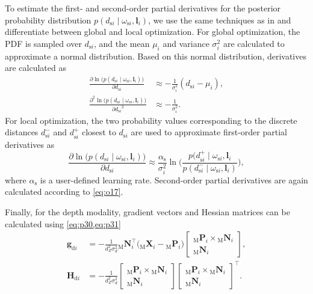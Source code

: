 \documentclass[10pt,twocolumn,letterpaper]{article}
\begin{document}
To estimate the first- and second-order partial derivatives for the posterior probability distribution $p(d_{\textrm{s}i}\mid\omega_{\textrm{s}i},\pmb{l}_i)$, we use the same techniques as in \cite{Stoiber2021} and differentiate between global and local optimization.
For global optimization, the \ac{PDF} is sampled over $d_{\textrm{s}i}$, and the mean $\mu_i$ and variance $\sigma_i^2$ are calculated to approximate a normal distribution.
Based on this normal distribution, derivatives are calculated as
\begin{align}\label{eq:o16}
	\frac{\partial\ln\big(p(d_{\textrm{s}i}\mid\omega_{\textrm{s}i},\pmb{l}_i)\big)}{\partial {d_{\textrm{s}i}}} &\approx -\frac{1}{\sigma_i^2}(d_{\textrm{s}i} - \mu_i),\\ \label{eq:o17}
	\frac{\partial^2\ln\big(p(d_{\textrm{s}i}\mid\omega_{\textrm{s}i},\pmb{l}_i)\big)}{\partial {d_{\textrm{s}i}}^2} &\approx -\frac{1}{\sigma_i^2}.
\end{align}
For local optimization, the two probability values corresponding to the discrete distances $d_{\textrm{s}i}^-$ and $d_{\textrm{s}i}^+$ closest to $d_{\textrm{s}i}$ are used to approximate first-order partial derivatives as
\begin{equation}\label{eq:o18}
	\frac{\partial\ln\big(p(d_{\textrm{s}i}\mid\omega_{\textrm{s}i},\pmb{l}_i)\big)}{\partial {d_{\textrm{s}i}}} \approx \frac{\alpha_\textrm{s}}{\sigma_i^2}\ln\bigg(\frac{p(d_{\textrm{s}i}^+\mid\omega_{\textrm{s}i},\pmb{l}_i}{p(d_{\textrm{s}i}^-\mid\omega_{\textrm{s}i},\pmb{l}_i)}\bigg),
\end{equation}
where $\alpha_\textrm{s}$ is a user-defined learning rate.
Second-order partial derivatives are again calculated according to \cref{eq:o17}.

Finally, for the depth modality, gradient vectors and Hessian matrices can be calculated using \cref{eq:p30,eq:p31}
\begin{align}\label{eq:o19}
	\pmb{g}_{\textrm{d}i} &= -\frac{1}{d_Z^2 \sigma_d^2}  {}_\textrm{M}\pmb{N}_i^\top
	\big({}_\textrm{M}\pmb{X}_i - {}_\textrm{M}\pmb{P}_i \big)
	\begin{bmatrix}
		{}_\textrm{M}\pmb{P}_i {\times}{}_\textrm{M}\pmb{N}_i \\
		{}_\textrm{M}\pmb{N}_i
	\end{bmatrix},\\\label{eq:o20}
	\pmb{H}_{\textrm{d}i} &= -\frac{1}{d_Z^2 \sigma_d^2}  
	\begin{bmatrix}
		{}_\textrm{M}\pmb{P}_i \times {}_\textrm{M}\pmb{N}_i \\
		{}_\textrm{M}\pmb{N}_i
	\end{bmatrix}
	\begin{bmatrix}
		{}_\textrm{M}\pmb{P}_i \times {}_\textrm{M}\pmb{N}_i \\
		{}_\textrm{M}\pmb{N}_i
	\end{bmatrix}^\top.
\end{align}
\end{document}
